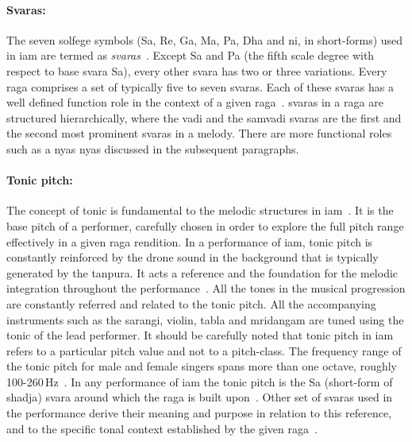 \paragraph{Svaras:} The seven solfege symbols (Sa, Re, Ga, Ma, Pa, Dha and \gls{ni}, in short-forms) used in \gls{iam} are termed as \textit{svaras}~\citep{Danielou2010,Bagchee1998}. Except Sa and Pa (the fifth scale degree with respect to base \gls{svara} Sa), every other \gls{svara} has two or three variations. Every \gls{raga} comprises a set of typically five to seven \glspl{svara}. Each of these \glspl{svara} has a well defined function role in the context of a given \gls{raga}~\citep{Viswanathan2004}. \Glspl{svara} in a \gls{raga} are structured hierarchically, where the \gls{vadi} and the \gls{samvadi} \glspl{svara} are the first and the second most prominent \glspl{svara} in a melody. There are more functional roles such as a \gls{nyas} \gls{nyas} discussed in the subsequent paragraphs. 


\paragraph{Tonic pitch:} The concept of tonic is fundamental to the melodic structures in \gls{iam}~\citep{Viswanathan2004,Danielou2010}. It is the base pitch of a performer, carefully chosen in order to explore the full pitch range effectively in a given \gls{raga} rendition. In a performance of \gls{iam}, tonic pitch is constantly reinforced by the drone sound in the background that is typically generated by the \gls{tanpura}. It acts a reference and the foundation for the melodic integration throughout the performance~\citep{Deva1980}. All the tones in the musical progression are constantly referred and related to the tonic pitch. All the accompanying instruments such as the \gls{sarangi}, violin, \gls{tabla} and \gls{mridangam} are tuned using the tonic of the lead performer. It should be carefully noted that tonic pitch in \gls{iam} refers to a particular pitch value and not to a pitch-class. The frequency range of the tonic pitch for male and female singers spans more than one octave, roughly 100-260\,Hz~\citep{Sengupta2005b}. In any performance of \gls{iam} the tonic pitch is the Sa (short-form of \gls{shadja}) \gls{svara} around which the \gls{raga} is built upon~\citep{Danielou2010,Bagchee1998}. Other set of \glspl{svara} used in the performance derive their meaning and purpose in relation to this reference, and to the specific tonal context established by the given \gls{raga}~\citep{Deva1980}. 

